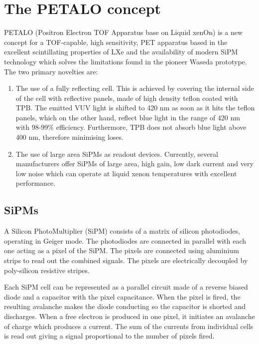 \documentclass{JINST}
\begin{document}
\section{The PETALO concept}
\label{sec.petalo}

PETALO (Positron Electron TOF Apparatus base on Liquid xenOn) is a new concept for a TOF-capable, high sensitivity, PET apparatus based in the excellent scintillating properties of LXe and the availability of modern SiPM technology which 
solves the limitations found in the pioneer Waseda prototype. The two primary novelties are:
\begin{enumerate}
\item The use of a fully reflecting cell. This is achieved by covering the internal side of the cell with reflective panels, made of high density teflon coated with TPB. The emitted VUV light is shifted to 420 nm as soon as it hits the teflon panels, which on the other hand, reflect blue light in the range of 420 nm with 98-99\% efficiency. Furthermore, TPB does not absorb blue light above 400 nm, therefore minimising loses. 
\item The use of large area SiPMs as readout devices. Currently, several manufacturers offer SiPMs of large area, high gain, low dark current and very low noise which can operate at liquid xenon temperatures with excellent performance.  
\end{enumerate} 

\subsection{SiPMs}

A Silicon PhotoMultiplier (SiPM) consists of a matrix of silicon photodiodes, operating in Geiger mode. The photodiodes are connected in parallel with each one acting as a pixel of the SiPM. The pixels are connected using aluminium strips to read out the combined signals. The pixels are electrically decoupled by poly-silicon resistive stripes.

Each SiPM cell can be represented as a parallel circuit made of a reverse biased diode and a capacitor with the pixel capacitance. When the pixel is fired, the resulting avalanche makes the diode conducting so the capacitor is shorted and discharges.
When a free electron is produced in one pixel, it initiates an avalanche of charge which produces a current. The sum of the currents from individual cells is read out giving a signal proportional to the number of pixels fired.
\end{document}

